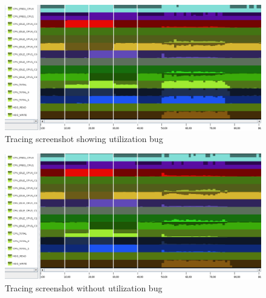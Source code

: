 %
\begin{figure}
	\centering
	\includegraphics[width=\linewidth, height=\textheight, keepaspectratio]{pix/bug}
	\caption{Tracing screenshot showing utilization bug}
	\label{fig:tracing}
\end{figure}
%
\begin{figure}
	\centering
	\includegraphics[width=\linewidth, height=\textheight, keepaspectratio]{pix/bugfree}
	\caption{Tracing screenshot without utilization bug}
	\label{fig:bugfree}
\end{figure}
%
\clearpage

%
%

%
%
